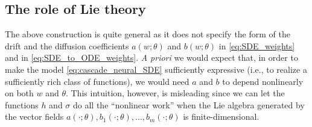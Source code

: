 \documentclass[letterpaper, 10pt, conference]{ieeeconf}
\begin{document}
\subsection{The role of Lie theory}

The above construction is quite general as it does not specify the form of the drift and the diffusion coefficients $a(w;\theta)$ and $b(w;\theta)$ in \eqref{eq:SDE_weights} and in \eqref{eq:SDE_to_ODE_weights}. \textit{A priori} we would expect that, in order to make the model \eqref{eq:cascade_neural_SDE} sufficiently expressive (i.e., to realize a sufficiently rich class of functions), we would need $a$ and $b$ to depend nonlinearly on both $w$ and $\theta$. This intuition, however, is misleading since we can let the functions $h$ and $\sigma$ do all the ``nonlinear work'' when the Lie algebra generated by the vector fields $a(\cdot;\theta), b_1(\cdot;\theta), \dots, b_m(\cdot;\theta)$ is finite-dimensional.
\end{document}
